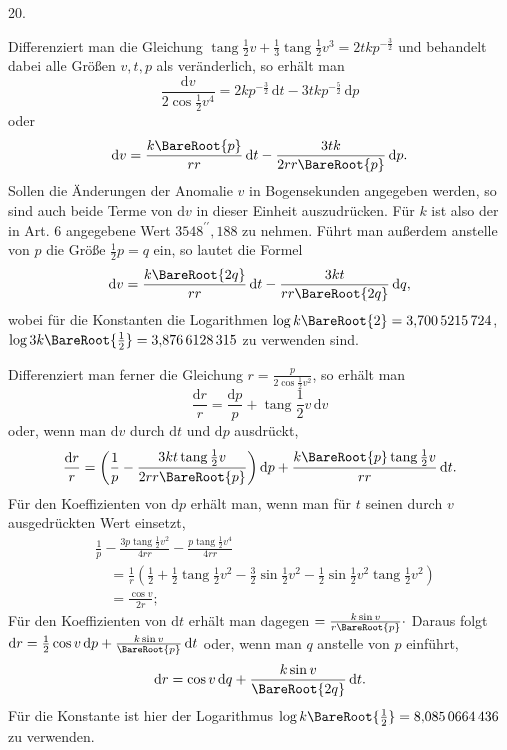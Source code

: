 \par{}
\begin{center}
\hypertarget{native-037-article020}{}20.
\end{center}
Differenziert man die Gleichung $\operatorname{tang}\frac{1}{2}v+\frac{1}{3}\operatorname{tang}\frac{1}{2}v^3=2t k p^{-\frac{3}{2}}$ und behandelt dabei alle Größen $v,t,p$ als veränderlich, so erhält man
\[
\frac{\mathrm{d}v}{2\cos\frac{1}{2}v^4}=2k p^{-\frac{3}{2}}\,\mathrm{d}t-3t k p^{-\frac{5}{2}}\,\mathrm{d}p
\]
oder
\[
\mathrm{d}v=\frac{k\BareRoot{p}}{r r}\,\mathrm{d}t-\frac{3t k}{2r r\BareRoot{p}}\,\mathrm{d}p.
\]
Sollen die Änderungen der Anomalie $v$ in Bogensekunden angegeben werden, so sind auch beide Terme von $\mathrm{d}v$ in dieser Einheit auszudrücken. Für $k$ ist also der in Art. 6 angegebene Wert $3548^{\prime\prime}{,}188$ zu nehmen. Führt man außerdem anstelle von $p$ die Größe $\frac{1}{2}p=q$ ein, so lautet die Formel
\[
\mathrm{d}v=\frac{k\BareRoot{2q}}{r r}\,\mathrm{d}t-\frac{3k t}{r r\BareRoot{2q}}\,\mathrm{d}q,
\]
wobei für die Konstanten die Logarithmen $\log k\BareRoot{2}=3{,}700\,5215\,724$,\\ $\log 3k\BareRoot{\frac{1}{2}}=3{,}876\,6128\,315$ zu verwenden sind.

Differenziert man ferner die Gleichung $r=\frac{p}{2\cos\frac{1}{2}v^2}$, so erhält man
\[
\frac{\mathrm{d}r}{r}=\frac{\mathrm{d}p}{p}+\operatorname{tang}\frac{1}{2}v\,\mathrm{d}v
\]
oder, wenn man $\mathrm{d}v$ durch $\mathrm{d}t$ und $\mathrm{d}p$ ausdrückt,
\[
\frac{\mathrm{d}r}{r}=\left(\frac{1}{p}-\frac{3k t\operatorname{tang}\frac{1}{2}v}{2r r\BareRoot{p}}\right)\mathrm{d}p+\frac{k\BareRoot{p}\operatorname{tang}\frac{1}{2}v}{r r}\,\mathrm{d}t.
\]
Für den Koeffizienten von $\mathrm{d}p$ erhält man, wenn man für $t$ seinen durch $v$ ausgedrückten Wert einsetzt,
\[
\begin{aligned}
&\frac{1}{p}-\frac{3p\operatorname{tang}\frac{1}{2}v^2}{4r r}-\frac{p\operatorname{tang}\frac{1}{2}v^4}{4r r}\\
&\quad=\frac{1}{r}\left(\frac{1}{2}+\frac{1}{2}\operatorname{tang}\frac{1}{2}v^2-\frac{3}{2}\sin\frac{1}{2}v^2-\frac{1}{2}\sin\frac{1}{2}v^2\operatorname{tang}\frac{1}{2}v^2\right)\\
&\quad=\frac{\cos v}{2r};
\end{aligned}
\]
Für den Koeffizienten von $\mathrm{d}t$ erhält man dagegen $=\frac{k\sin v}{r\BareRoot{p}}\cdot$ Daraus folgt $\mathrm{d}r=\frac{1}{2}\cos v\,\mathrm{d}p+\frac{k\sin v}{\BareRoot{p}}\,\mathrm{d}t$ oder, wenn man $q$ anstelle von $p$ einführt,
\[
\mathrm{d}r=\cos v\,\mathrm{d}q+\frac{k\sin v}{\BareRoot{2q}}\,\mathrm{d}t.
\]
Für die Konstante ist hier der Logarithmus $\log k\BareRoot{\frac{1}{2}}=8{,}085\,0664\,436$ zu verwenden.
